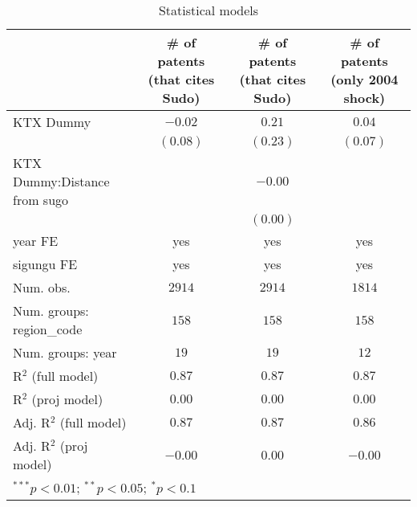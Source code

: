 
\begin{table}
\begin{center}
\begin{tabular}{l c c c}
\hline
 & # of patents (that cites Sudo) & # of patents (that cites Sudo) & # of patents (only 2004 shock) \\
\hline
KTX Dummy                    & $-0.02$  & $0.21$   & $0.04$   \\
                             & $(0.08)$ & $(0.23)$ & $(0.07)$ \\
KTX Dummy:Distance from sugo &          & $-0.00$  &          \\
                             &          & $(0.00)$ &          \\
\hline
year FE                      & yes      & yes      & yes      \\
sigungu FE                   & yes      & yes      & yes      \\
Num. obs.                    & $2914$   & $2914$   & $1814$   \\
Num. groups: region\_code    & $158$    & $158$    & $158$    \\
Num. groups: year            & $19$     & $19$     & $12$     \\
R$^2$ (full model)           & $0.87$   & $0.87$   & $0.87$   \\
R$^2$ (proj model)           & $0.00$   & $0.00$   & $0.00$   \\
Adj. R$^2$ (full model)      & $0.87$   & $0.87$   & $0.86$   \\
Adj. R$^2$ (proj model)      & $-0.00$  & $0.00$   & $-0.00$  \\
\hline
\multicolumn{4}{l}{\scriptsize{$^{***}p<0.01$; $^{**}p<0.05$; $^{*}p<0.1$}}
\end{tabular}
\caption{Statistical models}
\label{table:coefficients}
\end{center}
\end{table}

